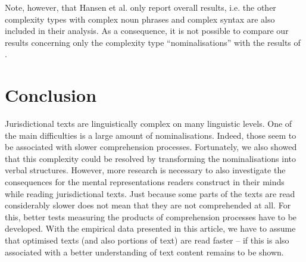 \documentclass[output=paper]{langsci/langscibook}
\begin{document}
Note, however, that Hansen et al. only report overall results, i.e. the other complexity types with complex noun phrases and complex syntax are also included in their analysis. As a consequence, it is not possible to compare our results concerning only the complexity type “nominalisations” with the results of \citet{Hansen2006}. 

\section{Conclusion}

Jurisdictional texts are linguistically complex on many linguistic levels. One of the main difficulties is a large amount of nominalisations. Indeed, those seem to be associated with slower comprehension processes. Fortunately, we also showed that this complexity could be resolved by transforming the nominalisations into verbal structures. However, more research is necessary to also investigate the consequences for the mental representations readers construct in their minds while reading jurisdictional texts. Just because some parts of the texts are read considerably slower does not mean that they are not comprehended at all. For this, better tests measuring the products of comprehension processes have to be developed. With the empirical data presented in this article, we have to assume that optimised texts (and also portions of text) are read faster – if this is also associated with a better understanding of text content remains to be shown.
\end{document}
